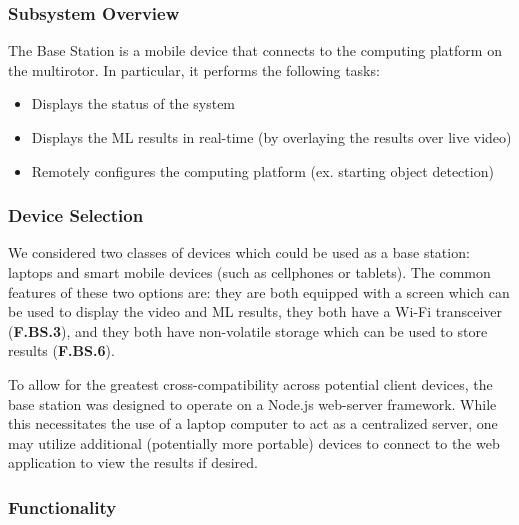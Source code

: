 \subsubsection{Subsystem Overview}

The Base Station is a mobile device that connects to the computing platform on the multirotor. In particular, it performs the following tasks:
\begin{itemize}
    \item Displays the status of the system
    \item Displays the ML results in real-time (by overlaying the results over live video)
    \item Remotely configures the computing platform (ex. starting object detection)
\end{itemize}

\subsubsection{Device Selection}
We considered two classes of devices which could be used as a base station: laptops and smart mobile devices (such as cellphones or tablets). The common features of these two options are: they are both equipped with a screen which can be used to display the video and ML results, they both have a Wi-Fi transceiver (\textbf{F.BS.3}), and they both have non-volatile storage which can be used to store results (\textbf{F.BS.6}).

To allow for the greatest cross-compatibility across potential client devices, the base station was designed to operate on a Node.js web-server framework. While this necessitates the use of a laptop computer to act as a centralized server, one may utilize additional (potentially more portable) devices to connect to the web application to view the results if desired.

\subsubsection{Functionality}

